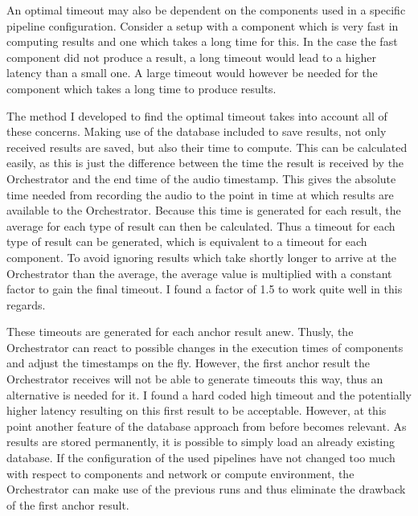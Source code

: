 An optimal timeout may also be dependent on the components used in a specific pipeline configuration.
Consider a setup with a component which is very fast in computing results and one which takes a long time for this.
In the case the fast component did not produce a result, a long timeout would lead to a higher latency than a small one.
A large timeout would however be needed for the component which takes a long time to produce results.

\label{main:orc:database}
The method I developed to find the optimal timeout takes into account all of these concerns.
Making use of the database included to save results, not only received results are saved, but also their time to compute.
This can be calculated easily, as this is just the difference between the time the result is received by the Orchestrator and the end time of the audio timestamp.
This gives the absolute time needed from recording the audio to the point in time at which results are available to the Orchestrator.
Because this time is generated for each result, the average for each type of result can then be calculated.
Thus a timeout for each type of result can be generated, which is equivalent to a timeout for each component.
To avoid ignoring results which take shortly longer to arrive at the Orchestrator than the average, the average value is multiplied with a constant factor to gain the final timeout.
I found a factor of 1.5 to work quite well in this regards.

These timeouts are generated for each anchor result anew.
Thusly, the Orchestrator can react to possible changes in the execution times of components and adjust the timestamps on the fly.
However, the first anchor result the Orchestrator receives will not be able to generate timeouts this way, thus an alternative is needed for it.
I found a hard coded high timeout and the potentially higher latency resulting on this first result to be acceptable.
However, at this point another feature of the database approach from before becomes relevant.
As results are stored permanently, it is possible to simply load an already existing database.
If the configuration of the used pipelines have not changed too much with respect to components and network or compute environment, the Orchestrator can make use of the previous runs and thus eliminate the drawback of the first anchor result.


